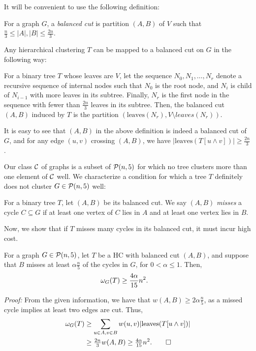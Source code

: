 It will be convenient to use the following definition:
\begin{defn}
For a graph $G$, a \emph{balanced cut} is partition $(A,B)$ of $V$ such that $\frac{n}{3} \leq |A|, |B| \leq \frac{2n}{3}$.
\end{defn}
Any hierarchical clustering $T$ can be mapped to a balanced cut on $G$ in the following way:
\begin{defn}
For a binary tree $T$ whose leaves are $V$, let the sequence $N_0, N_1, \ldots, N_r$ denote a recursive sequence of internal nodes such that $N_0$ is the root node, and $N_i$ is child of $N_{i-1}$ with more leaves in its subtree. Finally, $N_r$ is the first node in the sequence with fewer than $\frac{2n}{3}$ leaves in its subtree. Then, the balanced cut $(A,B)$ induced by $T$ is the partition $(\text{leaves}(N_r), V \setminus{leaves}(N_r))$.
\end{defn}
It is easy to see that $(A,B)$ in the above definition is indeed a balanced cut of $G$, and for any edge $(u,v)$ crossing $(A,B)$, we have $|\text{leaves}(T[u \wedge v])| \geq \frac{2n}{3}$.

Our class $\mathcal{C}$ of graphs is a subset of $\mathcal{P}(n,5)$ for which no tree clusters more than one element of $\mathcal{C}$ well. We characterize a condition for which a tree $T$ definitely does not cluster $G \in \mathcal{P}(n,5)$ well:

\begin{defn}
    For a binary tree $T$, let $(A,B)$ be its balanced cut. We say $(A,B)$ \emph{misses} a cycle $C \subseteq G$ if at least one vertex of $C$ lies in $A$ and at least one vertex lies in $B$.
\end{defn}
Now, we show that if $T$ misses many cycles in its balanced cut, it must incur high cost.

\begin{lem}\label{chap5-lem:clique-miss-bad}
    For a graph $G \in \mathcal{P}(n,5)$, let $T$ be a HC with balanced cut $(A,B)$, and suppose that $B$ misses at least $\alpha \frac{n}{5}$ of the cycles in $G$, for $0 < \alpha \leq 1$. Then,
    \begin{align*}
        \omega_G(T) &\geq \frac{4\alpha}{15} n^2.
    \end{align*}
\end{lem}
\noindent \textit{Proof:}
From the given information, we have that $w(A,B) \geq 2 \alpha \frac{n}{5}$, as a missed cycle implies at least two edges are cut. Thus,
\begin{align*}
    \omega_G(T) &\geq \sum_{u \in A, v \in B} w(u,v) |\text{leaves}(T[u \wedge v])| \\
    &\geq \tfrac{2n}{3} w(A,B) \geq \tfrac{4\alpha }{15} n^2. \qed
\end{align*} 

